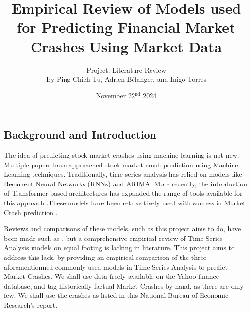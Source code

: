 \documentclass[12pt, letterpaper]{article}
\title{Empirical Review of Models used for Predicting Financial Market Crashes Using Market Data}
\author{\large Project: Literature Review \vspace{0.65em} \\ \normalsize By Ping-Chieh Tu, Adrien Bélanger, and Inigo Torres}
\date{November 22$^{\text{nd}}$ 2024}
\begin{document}
\maketitle 

\justifying %
\begin{comment}
Overall objective to keep in mind:

"In this milestone, the objective is to review the related literature to your proposal. This will better inform your methodology for your project if it involves a new idea, and it is necessary if you are comparing existing methods for a certain domain. It may even lead to a change of proposal, once you learn about existing methods out there. If you are producing a literature survey on a research topic, in this stage, you just provide a "breadth" review, in which you emphasize covering as many related works as possible and providing some preliminary organization without going into much detail."\\

Evaluation Criterias:

- Putting your proposal into context of related literature

- Coverage (are you adequately covering most relevant works)
\end{comment}
\subsection*{Background and Introduction}
The idea of predicting stock market crashes using machine learning is not new.
Multiple papers have approached stock market crash prediction using Machine Learning techniques. 
Traditionally, time series analysis has relied on models like Recurrent Neural Networks (RNNs) and ARIMA. More recently, the introduction of Transformer-based architectures has expanded the range of tools available for this approach \cite{Ahmed, ArunKumar}.These models have been retroactively used with success in Market Crash prediction \cite{Okpeke}. 

Reviews and comparisons of these models, such as this project aims to do, have been made such as \cite{Okpeke}, but a comprehensive empirical review of Time-Series Analysis models on equal footing is lacking in literature. 
This project aims to address this lack, by providing an empirical comparison of the three aforementionned commonly used models in Time-Series Analysis to predict Market Crashes. \cite{Ahmed} \cite{ArunKumar}
We shall use data freely available on the Yahoo finance database, and tag historically factual Market Crashes by hand, as there are only few. We shall use the crashes as listed in this National Bureau of Economic Research's report. \cite{Mishkin}
\end{document}

